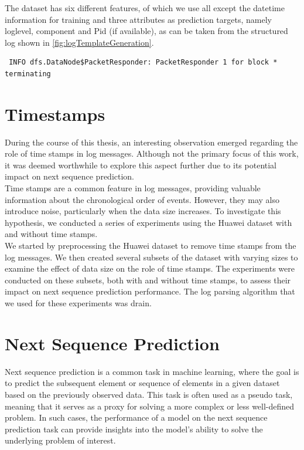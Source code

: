 The dataset has six different features, of which we use all except the datetime information for training and three attributes as prediction targets, namely loglevel, component and Pid (if available), as can be taken from the structured log shown in \ref{fig:logTemplateGeneration}.

\begin{verbatim}
 INFO dfs.DataNode$PacketResponder: PacketResponder 1 for block * terminating
\end{verbatim}
\section{Timestamps}
\label{sec:Methods:Timestamps}
During the course of this thesis, an interesting observation emerged regarding the role of time stamps in log messages. Although not the primary focus of this work, it was deemed worthwhile to explore this aspect further due to its potential impact on next sequence prediction.\\

Time stamps are a common feature in log messages, providing valuable information about the chronological order of events. However, they may also introduce noise, particularly when the data size increases. To investigate this hypothesis, we conducted a series of experiments using the Huawei dataset with and without time stamps.\\

We started by preprocessing the Huawei dataset to remove time stamps from the log messages. We then created several subsets of the dataset with varying sizes to examine the effect of data size on the role of time stamps. The experiments were conducted on these subsets, both with and without time stamps, to assess their impact on next sequence prediction performance. The log parsing algorithm that we used for these experiments was drain. 

\section{Next Sequence Prediction}
\label{sec:Methods:NSP}
Next sequence prediction is a common task in machine learning, where the goal is to predict the subsequent element or sequence of elements in a given dataset based on the previously observed data. This task is often used as a pseudo task, meaning that it serves as a proxy for solving a more complex or less well-defined problem. In such cases, the performance of a model on the next sequence prediction task can provide insights into the model's ability to solve the underlying problem of interest.\\

